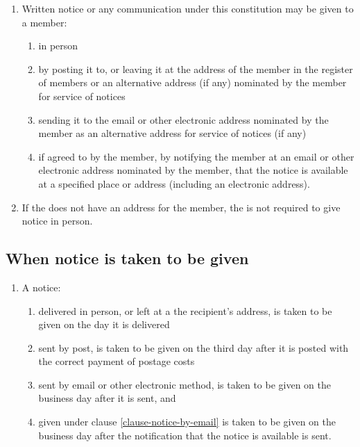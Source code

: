 \documentclass[a4paper]{article}
\let\emph\relax
\begin{document}
\begin{enumerate}
\item Written notice or any communication under this constitution may be given to a member:
    \begin{enumerate}
    \item in person
    \item by posting it to, or leaving it at the address of the member in the register of members or an alternative address (if any) nominated by the member for service of notices
    \item sending it to the email or other electronic address nominated by the member as an alternative address for service of notices (if any)
    \item if agreed to by the member, by notifying the member at an email or other electronic address nominated by the member, that the notice is available at a specified place or address (including an electronic address).\label{clause-notice-by-email}
    \end{enumerate}
\item If the \emph{company} does not have an address for the member, the \emph{company} is not required to give notice in person.
\end{enumerate}

\subsection{When notice is taken to be given}
\label{subsection-when-notice-is-taken-to-be-given}

\begin{enumerate}
\item A notice:
    \begin{enumerate}
    \item delivered in person, or left at a the recipient's address, is taken to be given on the day it is delivered
    \item sent by post, is taken to be given on the third day after it is posted with the correct payment of postage costs
    \item sent by email or other electronic method, is taken to be given on the business day after it is sent, and
    \item given under clause \ref{clause-notice-by-email} is taken to be given on the business day after the notification that the notice is available is sent.
    \end{enumerate}
\end{enumerate}
\end{document}
